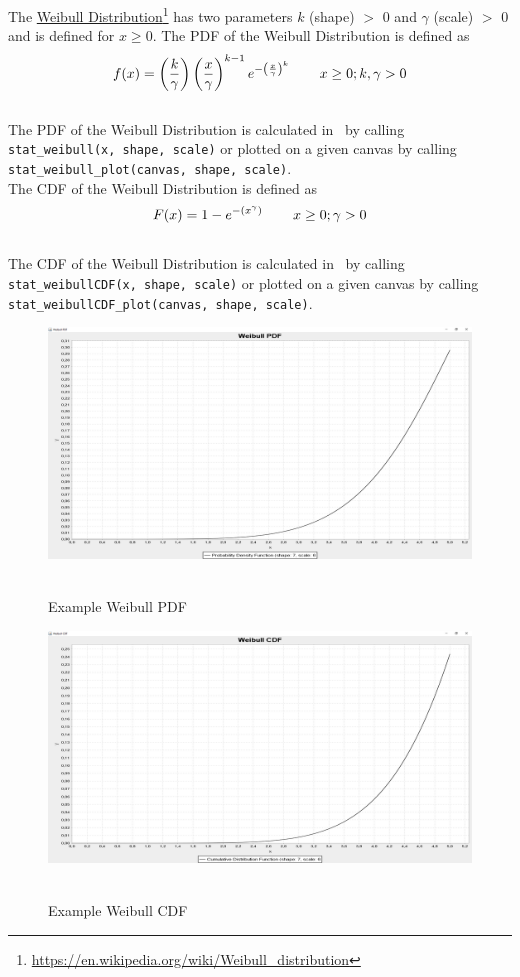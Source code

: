 		The \href{https://en.wikipedia.org/wiki/Weibull_distribution}{Weibull Distribution}\footnote{\url{https://en.wikipedia.org/wiki/Weibull_distribution}} has two parameters $k$ (shape) $>$ 0 and $\gamma$ (scale) $>$ 0 and is defined for $x \geq 0$. The \ac{PDF} of the Weibull Distribution is defined as
		\\[0.3cm]
		$$f(x) = \left(\frac{k}{\gamma}\right)\left(\frac{x}{\gamma}\right)^{k-1}e^{-\left(\frac{x}{\gamma}\right)^{k}} \hspace{.3in} x \geq 0; k,\gamma > 0\\$$
		\\[0.3cm]
		The \ac{PDF} of the Weibull Distribution is calculated in \setlx\ by calling \lstinline{stat_weibull(x, shape, scale)} or plotted on a given canvas by calling \lstinline{stat_weibull_plot(canvas, shape, scale)}.
		\\[0.3cm]
		The \ac{CDF} of the Weibull Distribution is defined as
		\\[0.3cm]
		$$F(x) = 1 - e^{-(x^{\gamma})} \hspace{.3in} x \geq 0; \gamma > 0$$
		\\[0.3cm]
		The \ac{CDF} of the Weibull Distribution is calculated in \setlx\ by calling \lstinline{stat_weibullCDF(x, shape, scale)} or plotted on a given canvas by calling \lstinline{stat_weibullCDF_plot(canvas, shape, scale)}.
		
		\begin{figure}[H]
			\centering
			\includegraphics[width=1\textwidth]{Figures/implemented_functions/weibull_pdf}~\\
			\caption{Example Weibull PDF}
			\label{fig:weibull_pdf}
		\end{figure}


		\begin{figure}[H]
			\centering
			\includegraphics[width=1\textwidth]{Figures/implemented_functions/weibull_cdf}~\\
			\caption{Example Weibull CDF}
			\label{fig:weibull_cdf}
		\end{figure}
